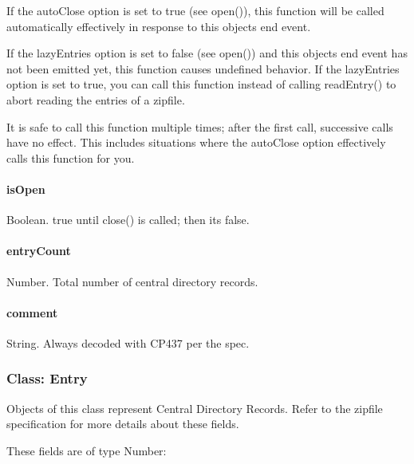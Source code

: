 If the {\ttfamily auto\+Close} option is set to {\ttfamily true} (see {\ttfamily open()}), this function will be called automatically effectively in response to this object\textquotesingle{}s {\ttfamily end} event.

If the {\ttfamily lazy\+Entries} option is set to {\ttfamily false} (see {\ttfamily open()}) and this object\textquotesingle{}s {\ttfamily end} event has not been emitted yet, this function causes undefined behavior. If the {\ttfamily lazy\+Entries} option is set to {\ttfamily true}, you can call this function instead of calling {\ttfamily read\+Entry()} to abort reading the entries of a zipfile.

It is safe to call this function multiple times; after the first call, successive calls have no effect. This includes situations where the {\ttfamily auto\+Close} option effectively calls this function for you.

\paragraph*{is\+Open}

{\ttfamily Boolean}. {\ttfamily true} until {\ttfamily close()} is called; then it\textquotesingle{}s {\ttfamily false}.

\paragraph*{entry\+Count}

{\ttfamily Number}. Total number of central directory records.

\paragraph*{comment}

{\ttfamily String}. Always decoded with {\ttfamily C\+P437} per the spec.

\subsubsection*{Class\+: Entry}

Objects of this class represent Central Directory Records. Refer to the zipfile specification for more details about these fields.

These fields are of type {\ttfamily Number}\+:


